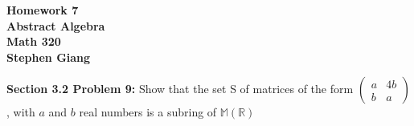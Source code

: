 \documentclass[12pt]{article}
\begin{document}
	
	\begin{center}
		\textbf{Homework 7} \\
		\textbf{Abstract Algebra} \\
		\textbf{Math 320} \\
		\textbf{Stephen Giang} \\
	\end{center}

\noindent \textbf{Section 3.2 Problem 9: }Show that the set S of matrices of the form 
	$\begin{pmatrix}
		a & 4b \\
		b & a
	\end{pmatrix}$
, with $a$ and $b$ real numbers is a subring of $\mathbb{M(R)}$ 
\\ \\
\end{document}
